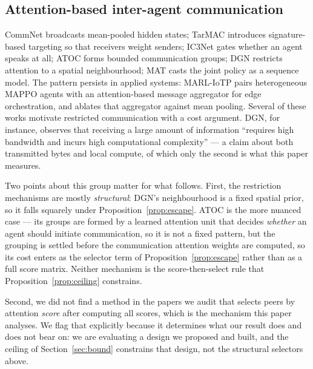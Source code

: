 \subsection{Attention-based inter-agent communication}

CommNet \citep{sukhbaatar2016commnet} broadcasts mean-pooled hidden states;
TarMAC \citep{das2019tarmac} introduces signature-based targeting so that
receivers weight senders; IC3Net \citep{singh2018ic3net} gates whether an agent
speaks at all; ATOC \citep{jiang2018atoc} forms bounded communication groups;
DGN \citep{jiang2018dgn} restricts attention to a spatial neighbourhood; MAT
\citep{wen2022mat} casts the joint policy as a sequence model. The pattern
persists in applied systems: MARL-IoTP \citep{hamdan2026marliotp} pairs
heterogeneous MAPPO agents with an attention-based message aggregator for edge
orchestration, and ablates that aggregator against mean pooling. Several of
these works motivate restricted communication with a cost argument. DGN, for
instance, observes that
receiving a large amount of information ``requires high bandwidth and incurs
high computational complexity'' \citep{jiang2018dgn} --- a claim about both
transmitted bytes and local compute, of which only the second is what this
paper measures.

Two points about this group matter for what follows. First, the restriction
mechanisms are mostly \emph{structural}: DGN's neighbourhood is a fixed spatial
prior, so it falls squarely under Proposition~\ref{prop:escape}. ATOC is the
more nuanced case --- its groups are formed by a learned attention unit that
decides \emph{whether} an agent should initiate communication, so it is not a
fixed pattern, but the grouping is settled before the communication attention
weights are computed, so its cost enters as the selector term of
Proposition~\ref{prop:escape} rather than as a full score matrix. Neither
mechanism is the score-then-select rule that
Proposition~\ref{prop:ceiling} constrains.

Second, we did not find a method in
the papers we audit
that selects peers by attention \emph{score} after computing all
scores, which is the mechanism this paper analyses. We flag that explicitly
because it determines what our result does and does not bear on: we are
evaluating a design we proposed and built, and the ceiling of
Section~\ref{sec:bound} constrains that design, not the structural selectors
above.

